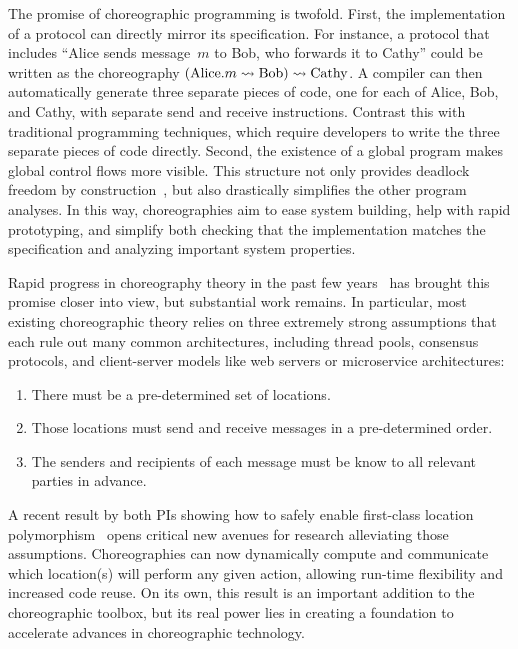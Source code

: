 The promise of choreographic programming is twofold.
First, the implementation of a protocol can directly mirror its specification.
For instance, a protocol that includes ``Alice sends message~$m$ to Bob, who forwards it to Cathy''
could be written as the choreography $(\text{Alice}.m \rightsquigarrow \text{Bob}) \rightsquigarrow \text{Cathy}$.
A compiler can then automatically generate three separate pieces of code, one for each of Alice, Bob, and Cathy,
with separate send and receive instructions.
Contrast this with traditional programming techniques, which require developers to write the three separate pieces of code directly.
Second, the existence of a global program makes global control flows more visible.
This structure not only provides deadlock freedom by construction~\cite{CarboneM13}, but also drastically simplifies the other program analyses.
In this way, choreographies aim to ease system building, help with rapid prototyping,
and simplify both checking that the implementation matches the specification
and analyzing important system properties.

Rapid progress in choreography theory in the past few years~\citep[e.g.,][]{HirschG22,CruzFilipeGLMP22,CruzFilipeGLMP23,BatesK+25,SamuelsonHC25}
has brought this promise closer into view, but substantial work remains.
In particular, most existing choreographic theory relies on three extremely strong assumptions
that each rule out many common architectures, including thread pools, consensus protocols, and client-server models like web servers or microservice architectures:
\begin{enumerate}
  \item\label{li:assume:static-locs}
    There must be a pre-determined set of locations.
  \item\label{li:assume:known-order}
    Those locations must send and receive messages in a pre-determined order.
  \item\label{li:assume:known-endpoints}
    The senders and recipients of each message must be know to all relevant parties in advance.
\end{enumerate}

A recent result by both PIs showing how to safely enable first-class location polymorphism~\citep{SamuelsonHC25} opens critical new avenues for research alleviating those assumptions.
Choreographies can now dynamically compute and communicate which location(s) will perform any given action,
allowing run-time flexibility and increased code reuse.
On its own, this result is an important addition to the choreographic toolbox,
but its real power lies in creating a foundation to accelerate advances in choreographic technology.

